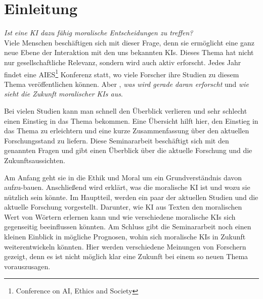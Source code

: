 \section{Einleitung}\label{sec:einleitung}

\textit{Ist eine KI dazu fähig moralische Entscheidungen zu treffen?} \\
Viele Menschen beschäftigen sich mit dieser Frage, denn sie ermöglicht eine
ganz neue Ebene der Interaktion mit den uns bekannten KIs.
Dieses Thema hat nicht nur gesellschaftliche Relevanz, sondern wird auch
aktiv erforscht.
Jedes Jahr findet eine AIES\footnote{Conference on AI, Ethics and Society} Konferenz statt, wo viele
Forscher ihre Studien zu diesem Thema veröffentlichen können.
Aber , \textit{was wird gerade daran erforscht} und \textit{wie sieht die Zukunft moralischer KIs aus}.

Bei vielen Studien kann man schnell den Überblick verlieren und sehr schlecht einen Einstieg in das Thema bekommen.
Eine Übersicht hilft hier, den Einstieg in das Thema zu erleichtern und eine kurze Zusammenfassung über
den aktuellen Forschungsstand zu liefern.
Diese Seminararbeit beschäftigt sich mit den genannten Fragen und gibt einen Überblick über die aktuelle Forschung und die Zukunftsaussichten.

Am Anfang geht sie in die Ethik und Moral um ein Grundverständnis davon aufzu-bauen.
Anschließend wird erklärt, was die moralische KI ist und wozu sie nützlich sein könnte.
Im Hauptteil, werden ein paar der aktuellen Studien und die aktuelle Forschung vorgestellt.
Darunter, wie KI aus Texten den moralischen Wert von Wörtern erlernen kann und wie verschiedene moralische
KIs sich gegenseitig beeinflussen könnten.
Am Schluss gibt die Seminararbeit noch einen kleinen Einblick in mögliche Prognosen, wohin sich
moralische KIs in Zukunft weiterentwickeln könnten.
Hier werden verschiedene Meinungen von Forschern gezeigt, denn es ist nicht möglich klar eine
Zukunft bei einem so neuen Thema vorauszusagen.


